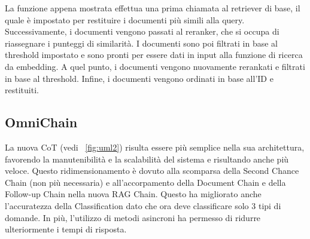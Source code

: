 La funzione appena mostrata effettua una prima chiamata al retriever di base, il quale è impostato per restituire i documenti più simili alla query. Successivamente, i documenti vengono passati al reranker, che si occupa di riassegnare i punteggi di similarità. I documenti sono poi filtrati in base al threshold impostato e sono pronti per essere dati in input alla funzione di ricerca da embedding. A quel punto, i documenti vengono nuovamente rerankati e filtrati in base al threshold. Infine, i documenti vengono ordinati in base all'ID e restituiti.

\subsection{OmniChain}
La nuova CoT (vedi \figurename{~\ref{fig:uml2}}) risulta essere più semplice nella sua architettura, favorendo la manutenibilità e la scalabilità del sistema e risultando anche più veloce. Questo ridimensionamento è dovuto alla scomparsa della Second Chance Chain (non più necessaria) e all'accorpamento della Document Chain e della Follow-up Chain nella nuova RAG Chain. Questo ha migliorato anche l'accuratezza della Classification dato che ora deve classificare solo 3 tipi di domande. In più, l'utilizzo di metodi asincroni ha permesso di ridurre ulteriormente i tempi di risposta.
